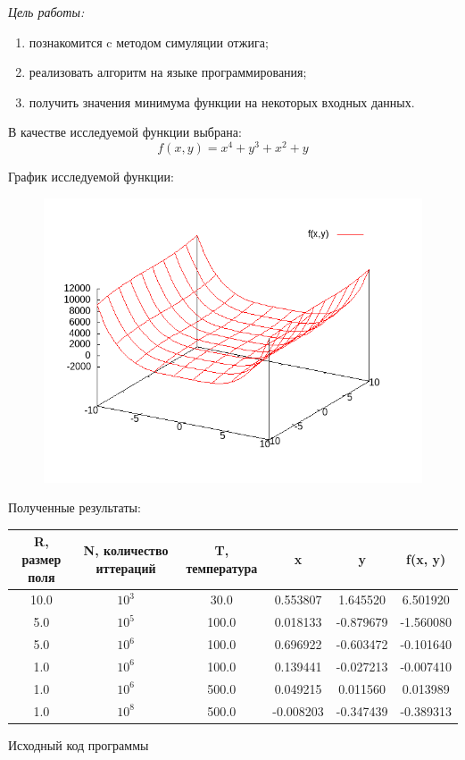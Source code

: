 \documentclass[pscyr,nonums]{hedlab}
\begin{document}
    \makeheader
    \lstset{language=c++, basicstyle=\tiny}

    \noindent\emph{Цель работы:} 
    \begin{enumerate}
        \item познакомится c методом симуляции отжига;
        \item реализовать алгоритм на языке программирования;
        \item получить значения минимума функции на некоторых входных данных.
    \end{enumerate}

    В качестве исследуемой функции выбрана:
    \[
        f(x, y) = x^4 + y^3 + x^2 + y
    \]

    График исследуемой функции:
    \begin{figure}[h!]
        \centering
        \includegraphics[width=.47\textwidth]{graph}
    \end{figure}

    Полученные результаты:
    \begin{center}
        \begin{tabular}{|c|c|c|c|c|c|}
            \hline
            R, размер поля & N, количество иттераций & T, температура & 
            x & y & f(x, y) \\ \hline
            10.0 & \( 10^3 \) &  30.0 &  0.553807 &  1.645520 &  6.501920 \\ \hline
             5.0 & \( 10^5 \) & 100.0 &  0.018133 & -0.879679 & -1.560080 \\ \hline
             5.0 & \( 10^6 \) & 100.0 &  0.696922 & -0.603472 & -0.101640 \\ \hline
             1.0 & \( 10^6 \) & 100.0 &  0.139441 & -0.027213 & -0.007410 \\ \hline
             1.0 & \( 10^6 \) & 500.0 &  0.049215 &  0.011560 &  0.013989 \\ \hline
             1.0 & \( 10^8 \) & 500.0 & -0.008203 & -0.347439 & -0.389313 \\ \hline
        \end{tabular}
    \end{center}

    \clearpage

    \noindent Исходный код программы
    
\end{document}
